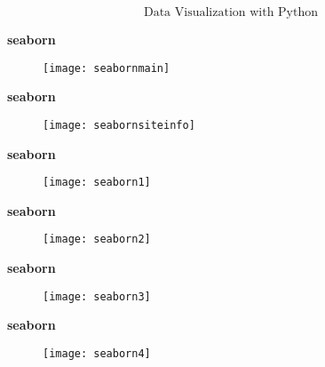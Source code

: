 \documentclass[MASTER.tex]{subfiles}
\begin{document}
 

 
  
  \huge
  \[ \mbox{Data Visualization with Python} \]
  
 
 
  
 \textbf{seaborn}
 
 \begin{figure}
  \centering
  \texttt{[image: seabornmain]}
  
 \end{figure}
 
 
  
 \textbf{seaborn}
 
 \begin{figure}
  \centering
  \texttt{[image: seabornsiteinfo]}
  
 \end{figure}
 
 
  
 \textbf{seaborn}
 
 \begin{figure}
  \centering
  \texttt{[image: seaborn1]}
  
 \end{figure}
 

 
   
  \textbf{seaborn}
  
 \begin{figure}
  \centering
  \texttt{[image: seaborn2]}
 \end{figure}
 

 
   
  \textbf{seaborn}
  
 \begin{figure}
  \centering
  \texttt{[image: seaborn3]}  
 \end{figure}
 

 
   
  \textbf{seaborn}
  
 \begin{figure}
  \centering
  \texttt{[image: seaborn4]}
  
 \end{figure}
 

 
\end{document}
